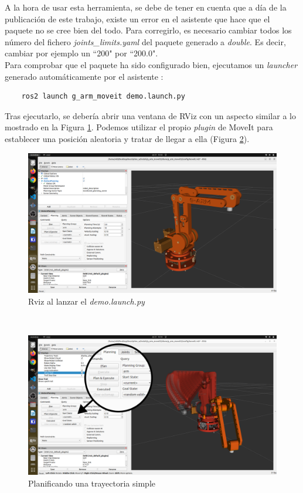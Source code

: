 A la hora de usar esta herramienta, se debe de tener en cuenta que a día de la publicación de este trabajo, existe un error en el asistente
que hace que el paquete no se cree bien del todo. Para corregirlo, es necesario cambiar todos los número del fichero \textit{joints\_limits.yaml}
del paquete generado a \textit{double}. Es decir, cambiar por ejemplo un ``200" por ``200.0".
\\
\newpage
Para comprobar que el paquete ha sido configurado bien, ejecutamos un \textit{launcher} generado automáticamente por el asistente :
\begin{verbatim}
    ros2 launch g_arm_moveit demo.launch.py
\end{verbatim}
Tras ejecutarlo, se debería abrir una ventana de RViz con un aspecto similar a lo mostrado en la Figura \ref{fig:moveit_demo}. Podemos utilizar 
el propio \textit{plugin} de MoveIt para establecer una posición aleatoria y tratar de llegar a ella (Figura \ref{fig:moveit_trayectory_demo}).
\begin{figure} [ht!]
    \begin{center}
      \includegraphics[width=13cm]{figs/moveit_demo.png}
    \end{center}
    \caption{Rviz al lanzar el \textit{demo.launch.py}}
    \label{fig:moveit_demo}
\end{figure}\ 

\begin{figure} [ht!]
    \begin{center}
      \includegraphics[width=13cm]{figs/moveit_demo_trajectory.png}
    \end{center}
    \caption{Planificando una trayectoria simple}
    \label{fig:moveit_trayectory_demo}
\end{figure}\ 

